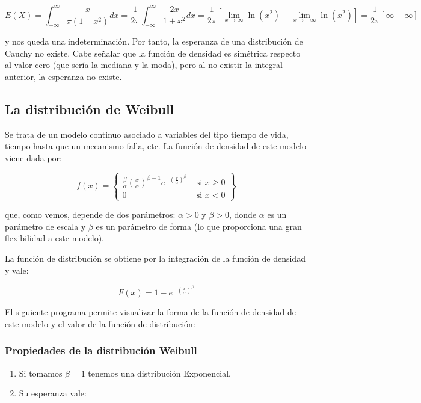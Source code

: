 \documentclass[
  a4paper,
  DIV=11,
  numbers=noendperiod]{scrreprt}
\begin{document}
\[
E(X)=\int_{-\infty}^{\infty} \frac{x}{\pi\left(1+x^{2}\right)} d x=\frac{1}{2 \pi} \int_{-\infty}^{\infty} \frac{2 x}{1+x^{2}} d x=\frac{1}{2 \pi}\left[\lim _{x \rightarrow \infty} \ln \left(x^{2}\right)-\lim _{x \rightarrow-\infty} \ln \left(x^{2}\right)\right]=\frac{1}{2 \pi}[\infty-\infty]
\]

y nos queda una indeterminación. Por tanto, la esperanza de una
distribución de Cauchy no existe. Cabe señalar que la función de
densidad es simétrica respecto al valor cero (que sería la mediana y la
moda), pero al no existir la integral anterior, la esperanza no existe.

\subsection{La distribución de
Weibull}\label{la-distribuciuxf3n-de-weibull}

Se trata de un modelo continuo asociado a variables del tipo tiempo de
vida, tiempo hasta que un mecanismo falla, etc. La función de densidad
de este modelo viene dada por:

\[
f(x)=\left\{\begin{array}{ll}
\frac{\beta}{\alpha}\left(\frac{x}{\alpha}\right)^{\beta-1} e^{-\left(\frac{x}{\alpha}\right)^{\beta}} & \text { si } x \geq 0 \\
0 & \text { si } x<0
\end{array}\right\}
\]

que, como vemos, depende de dos parámetros: \(\alpha>0\) y \(\beta>0\),
donde \(\alpha\) es un parámetro de escala y \(\beta\) es un parámetro
de forma (lo que proporciona una gran flexibilidad a este modelo).

La función de distribución se obtiene por la integración de la función
de densidad y vale:

\[
F(x)=1-e^{-\left(\frac{x}{\alpha}\right)^{\beta}}
\]

El siguiente programa permite visualizar la forma de la función de
densidad de este modelo y el valor de la función de distribución:

\subsubsection{Propiedades de la distribución
Weibull}\label{propiedades-de-la-distribuciuxf3n-weibull}

\begin{enumerate}
\def\labelenumi{\arabic{enumi}.}
\item
  Si tomamos \(\beta=1\) tenemos una distribución Exponencial.
\item
  Su esperanza vale:
\end{enumerate}
\end{document}
